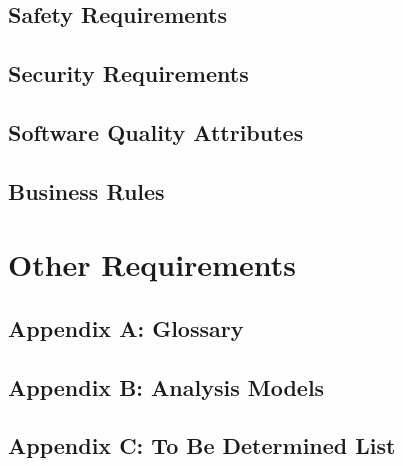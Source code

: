 \documentclass{scrreprt}
\begin{document}
\section{Safety Requirements}

\section{Security Requirements}

\section{Software Quality Attributes}

\section{Business Rules}


\chapter{Other Requirements}

\section{Appendix A: Glossary}

\section{Appendix B: Analysis Models}

\section{Appendix C: To Be Determined List}
\end{document}
